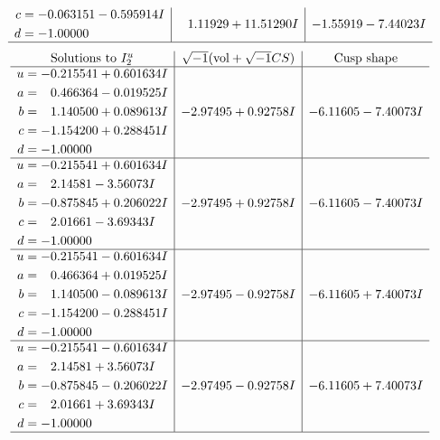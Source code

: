 \documentclass[1p]{elsarticle_modified}
\theoremstyle{definition}
\newcommand{\I}{\sqrt{-1}}
\begin{document}
$$\begin{array}{c|c|c}
\begin{aligned}
c &= -0.063151 - 0.595914 I \\
d &= -1.00000\phantom{ +0.000000I}\end{aligned}
 & \phantom{-}1.11929 + 11.51290 I & -1.55919 - 7.44023 I\\
 \hline 
 \end{array}$$\newpage$$\begin{array}{c|c|c}  
\text{Solutions to }I^u_{2}& \I (\text{vol} + \sqrt{-1}CS) & \text{Cusp shape}\\
 \hline 
\begin{aligned}
u &= -0.215541 + 0.601634 I \\
a &= \phantom{-}0.466364 - 0.019525 I \\
b &= \phantom{-}1.140500 + 0.089613 I \\
c &= -1.154200 + 0.288451 I \\
d &= -1.00000\phantom{ +0.000000I}\end{aligned}
 & -2.97495 + 0.92758 I & -6.11605 - 7.40073 I \\ \hline\begin{aligned}
u &= -0.215541 + 0.601634 I \\
a &= \phantom{-}2.14581 - 3.56073 I \\
b &= -0.875845 + 0.206022 I \\
c &= \phantom{-}2.01661 - 3.69343 I \\
d &= -1.00000\phantom{ +0.000000I}\end{aligned}
 & -2.97495 + 0.92758 I & -6.11605 - 7.40073 I \\ \hline\begin{aligned}
u &= -0.215541 - 0.601634 I \\
a &= \phantom{-}0.466364 + 0.019525 I \\
b &= \phantom{-}1.140500 - 0.089613 I \\
c &= -1.154200 - 0.288451 I \\
d &= -1.00000\phantom{ +0.000000I}\end{aligned}
 & -2.97495 - 0.92758 I & -6.11605 + 7.40073 I \\ \hline\begin{aligned}
u &= -0.215541 - 0.601634 I \\
a &= \phantom{-}2.14581 + 3.56073 I \\
b &= -0.875845 - 0.206022 I \\
c &= \phantom{-}2.01661 + 3.69343 I \\
d &= -1.00000\phantom{ +0.000000I}\end{aligned}
 & -2.97495 - 0.92758 I & -6.11605 + 7.40073 I\\
 \hline 
 \end{array}$$\newpage\newpage\renewcommand{\arraystretch}{1}
\end{document}
